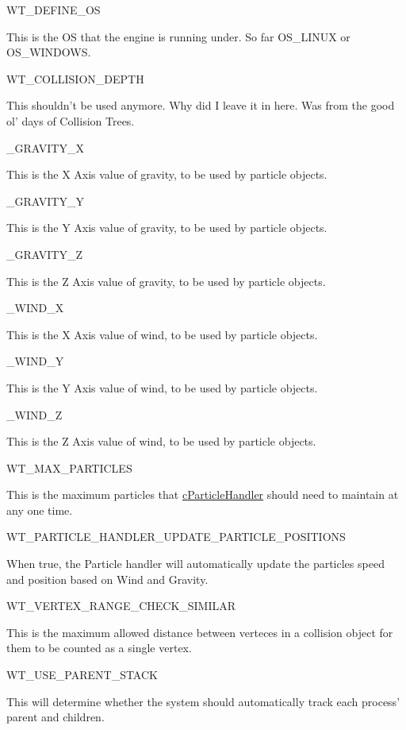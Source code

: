 \begin{DoxyItemize}
 WT\_\-DEFINE\_\-OS
\item This is the OS that the engine is running under. So far OS\_\-LINUX or OS\_\-WINDOWS.\par
 WT\_\-COLLISION\_\-DEPTH
\item This shouldn't be used anymore. Why did I leave it in here. Was from the good ol' days of Collision Trees.\par
 \_\-GRAVITY\_\-X
\item This is the X Axis value of gravity, to be used by particle objects.\par
 \_\-GRAVITY\_\-Y
\item This is the Y Axis value of gravity, to be used by particle objects.\par
 \_\-GRAVITY\_\-Z
\item This is the Z Axis value of gravity, to be used by particle objects.\par
 \_\-WIND\_\-X
\item This is the X Axis value of wind, to be used by particle objects.\par
 \_\-WIND\_\-Y
\item This is the Y Axis value of wind, to be used by particle objects.\par
 \_\-WIND\_\-Z
\item This is the Z Axis value of wind, to be used by particle objects.\par
 WT\_\-MAX\_\-PARTICLES
\item This is the maximum particles that \hyperlink{classc_particle_handler}{cParticleHandler} should need to maintain at any one time.\par
 WT\_\-PARTICLE\_\-HANDLER\_\-UPDATE\_\-PARTICLE\_\-POSITIONS
\item When true, the Particle handler will automatically update the particles speed and position based on Wind and Gravity.\par
 WT\_\-VERTEX\_\-RANGE\_\-CHECK\_\-SIMILAR
\item This is the maximum allowed distance between verteces in a collision object for them to be counted as a single vertex.\par
 WT\_\-USE\_\-PARENT\_\-STACK
\item This will determine whether the system should automatically track each process' parent and children.\par
 
\end{DoxyItemize}